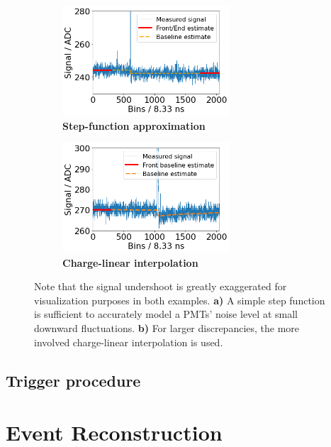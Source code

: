 \begin{figure}
	\centering
	\begin{subfigure}[h]{0.45\linewidth}
	\includegraphics[height=4.1cm]{./plots/baseline_step_function.png}
	\caption{\textbf{Step-function approximation}\label{fig:baseline-step-function}}
	\end{subfigure}
	\hfill
	\begin{subfigure}[h]{0.45\linewidth}
	\includegraphics[height=4.1cm]{./plots/baseline_charge_interpolation.png}
	\caption{\textbf{Charge-linear interpolation}\label{fig:baseline-charge-linear}}
	\end{subfigure}
	\caption*{Note that the signal undershoot is greatly exaggerated for visualization purposes in both examples. \textbf{a)} A simple step function is sufficient 
	to accurately model a PMTs' noise level at small downward fluctuations. \textbf{b)} For larger discrepancies, the more involved charge-linear interpolation is 
	used. \label{fig:baseline-estimation}}
\end{figure}

\subsection{Trigger procedure}
\label{ssec:sd-triggers}




\section{Event Reconstruction}
\label{sec:event-reconstruction}


